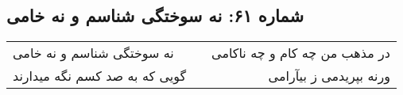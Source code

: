 \begin{center}
\section*{شماره ۶۱: نه سوختگی شناسم و نه خامی}
\label{sec:061}
\begin{longtable}{l p{0.5cm} r}
نه سوختگی شناسم و نه خامی
&&
در مذهب من چه کام و چه ناکامی
\\
گویی که به صد کسم نگه میدارند
&&
ورنه بپریدمی ز بیآرامی
\\
\end{longtable}
\end{center}
